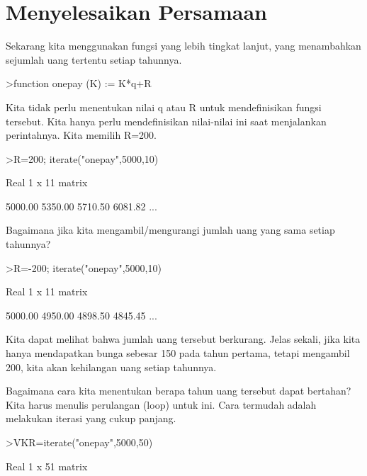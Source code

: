 \documentclass{article}
\newenvironment{eulernotebook}{\par}{\par}
\newcommand{\eulerheading}[1]{\section{#1}}
\newenvironment{eulercomment}{\par\medskip}{\par\medskip}
\begin{document}
\begin{eulernotebook}
\begin{eulercomment}
\begin{eulercomment}
\begin{eulercomment}
\begin{eulercomment}
\begin{eulercomment}
\begin{eulercomment}
\begin{eulercomment}
\begin{eulercomment}
\begin{eulercomment}
\begin{eulercomment}
\eulerheading{Menyelesaikan Persamaan}
\begin{eulercomment}
Sekarang kita menggunakan fungsi yang lebih tingkat lanjut, yang
menambahkan sejumlah uang tertentu setiap tahunnya.
\end{eulercomment}
\begin{eulerprompt}
>function onepay (K) := K*q+R
\end{eulerprompt}
\begin{eulercomment}
Kita tidak perlu menentukan nilai \textdollar{}q\textdollar{} atau \textdollar{}R\textdollar{} untuk mendefinisikan
fungsi tersebut. Kita hanya perlu mendefinisikan nilai-nilai ini saat
menjalankan perintahnya. Kita memilih R=200.
\end{eulercomment}
\begin{eulerprompt}
>R=200; iterate("onepay",5000,10)
\end{eulerprompt}
\begin{euleroutput}
  Real 1 x 11 matrix
  
      5000.00     5350.00     5710.50     6081.82     ...
\end{euleroutput}
\begin{eulercomment}
Bagaimana jika kita mengambil/mengurangi jumlah uang yang sama setiap
tahunnya?
\end{eulercomment}
\begin{eulerprompt}
>R=-200; iterate("onepay",5000,10)
\end{eulerprompt}
\begin{euleroutput}
  Real 1 x 11 matrix
  
      5000.00     4950.00     4898.50     4845.45     ...
\end{euleroutput}
\begin{eulercomment}
Kita dapat melihat bahwa jumlah uang tersebut berkurang. Jelas sekali,
jika kita hanya mendapatkan bunga sebesar 150 pada tahun pertama,
tetapi mengambil 200, kita akan kehilangan uang setiap tahunnya.

Bagaimana cara kita menentukan berapa tahun uang tersebut dapat
bertahan? Kita harus menulis perulangan (loop) untuk ini. Cara
termudah adalah melakukan iterasi yang cukup panjang.
\end{eulercomment}
\begin{eulerprompt}
>VKR=iterate("onepay",5000,50)
\end{eulerprompt}
\begin{euleroutput}
  Real 1 x 51 matrix
  

\end{euleroutput}
\end{eulercomment}
\end{eulercomment}
\end{eulercomment}
\end{eulercomment}
\end{eulercomment}
\end{eulercomment}
\end{eulercomment}
\end{eulercomment}
\end{eulercomment}
\end{eulercomment}
\end{eulernotebook}
\end{document}
